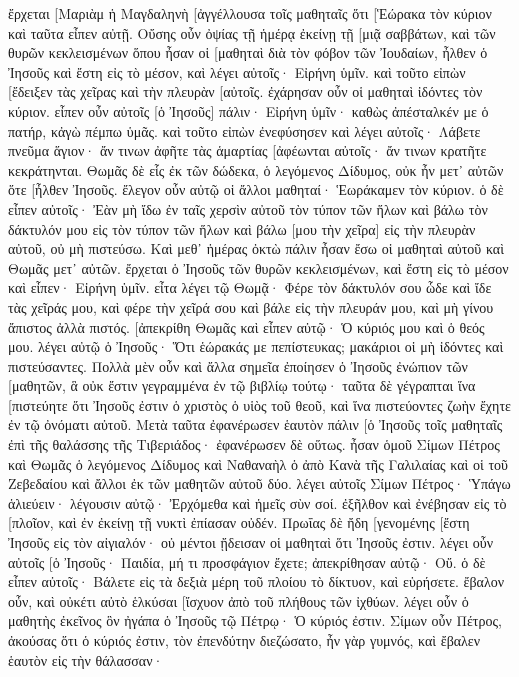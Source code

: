 ἔρχεται [Μαριὰμ ἡ Μαγδαληνὴ [ἀγγέλλουσα τοῖς μαθηταῖς ὅτι [Ἑώρακα τὸν κύριον καὶ ταῦτα εἶπεν αὐτῇ. 
Οὔσης οὖν ὀψίας τῇ ἡμέρᾳ ἐκείνῃ τῇ [μιᾷ σαββάτων, καὶ τῶν θυρῶν κεκλεισμένων ὅπου ἦσαν οἱ [μαθηταὶ διὰ τὸν φόβον τῶν Ἰουδαίων, ἦλθεν ὁ Ἰησοῦς καὶ ἔστη εἰς τὸ μέσον, καὶ λέγει αὐτοῖς· Εἰρήνη ὑμῖν. 
καὶ τοῦτο εἰπὼν [ἔδειξεν τὰς χεῖρας καὶ τὴν πλευρὰν [αὐτοῖς. ἐχάρησαν οὖν οἱ μαθηταὶ ἰδόντες τὸν κύριον. 
εἶπεν οὖν αὐτοῖς [ὁ Ἰησοῦς] πάλιν· Εἰρήνη ὑμῖν· καθὼς ἀπέσταλκέν με ὁ πατήρ, κἀγὼ πέμπω ὑμᾶς. 
καὶ τοῦτο εἰπὼν ἐνεφύσησεν καὶ λέγει αὐτοῖς· Λάβετε πνεῦμα ἅγιον· 
ἄν τινων ἀφῆτε τὰς ἁμαρτίας [ἀφέωνται αὐτοῖς· ἄν τινων κρατῆτε κεκράτηνται. 
Θωμᾶς δὲ εἷς ἐκ τῶν δώδεκα, ὁ λεγόμενος Δίδυμος, οὐκ ἦν μετ᾽ αὐτῶν ὅτε [ἦλθεν Ἰησοῦς. 
ἔλεγον οὖν αὐτῷ οἱ ἄλλοι μαθηταί· Ἑωράκαμεν τὸν κύριον. ὁ δὲ εἶπεν αὐτοῖς· Ἐὰν μὴ ἴδω ἐν ταῖς χερσὶν αὐτοῦ τὸν τύπον τῶν ἥλων καὶ βάλω τὸν δάκτυλόν μου εἰς τὸν τύπον τῶν ἥλων καὶ βάλω [μου τὴν χεῖρα] εἰς τὴν πλευρὰν αὐτοῦ, οὐ μὴ πιστεύσω. 
Καὶ μεθ᾽ ἡμέρας ὀκτὼ πάλιν ἦσαν ἔσω οἱ μαθηταὶ αὐτοῦ καὶ Θωμᾶς μετ᾽ αὐτῶν. ἔρχεται ὁ Ἰησοῦς τῶν θυρῶν κεκλεισμένων, καὶ ἔστη εἰς τὸ μέσον καὶ εἶπεν· Εἰρήνη ὑμῖν. 
εἶτα λέγει τῷ Θωμᾷ· Φέρε τὸν δάκτυλόν σου ὧδε καὶ ἴδε τὰς χεῖράς μου, καὶ φέρε τὴν χεῖρά σου καὶ βάλε εἰς τὴν πλευράν μου, καὶ μὴ γίνου ἄπιστος ἀλλὰ πιστός. 
[ἀπεκρίθη Θωμᾶς καὶ εἶπεν αὐτῷ· Ὁ κύριός μου καὶ ὁ θεός μου. 
λέγει αὐτῷ ὁ Ἰησοῦς· Ὅτι ἑώρακάς με πεπίστευκας; μακάριοι οἱ μὴ ἰδόντες καὶ πιστεύσαντες. 
Πολλὰ μὲν οὖν καὶ ἄλλα σημεῖα ἐποίησεν ὁ Ἰησοῦς ἐνώπιον τῶν [μαθητῶν, ἃ οὐκ ἔστιν γεγραμμένα ἐν τῷ βιβλίῳ τούτῳ· 
ταῦτα δὲ γέγραπται ἵνα [πιστεύητε ὅτι Ἰησοῦς ἐστιν ὁ χριστὸς ὁ υἱὸς τοῦ θεοῦ, καὶ ἵνα πιστεύοντες ζωὴν ἔχητε ἐν τῷ ὀνόματι αὐτοῦ. 
Μετὰ ταῦτα ἐφανέρωσεν ἑαυτὸν πάλιν [ὁ Ἰησοῦς τοῖς μαθηταῖς ἐπὶ τῆς θαλάσσης τῆς Τιβεριάδος· ἐφανέρωσεν δὲ οὕτως. 
ἦσαν ὁμοῦ Σίμων Πέτρος καὶ Θωμᾶς ὁ λεγόμενος Δίδυμος καὶ Ναθαναὴλ ὁ ἀπὸ Κανὰ τῆς Γαλιλαίας καὶ οἱ τοῦ Ζεβεδαίου καὶ ἄλλοι ἐκ τῶν μαθητῶν αὐτοῦ δύο. 
λέγει αὐτοῖς Σίμων Πέτρος· Ὑπάγω ἁλιεύειν· λέγουσιν αὐτῷ· Ἐρχόμεθα καὶ ἡμεῖς σὺν σοί. ἐξῆλθον καὶ ἐνέβησαν εἰς τὸ [πλοῖον, καὶ ἐν ἐκείνῃ τῇ νυκτὶ ἐπίασαν οὐδέν. 
Πρωΐας δὲ ἤδη [γενομένης [ἔστη Ἰησοῦς εἰς τὸν αἰγιαλόν· οὐ μέντοι ᾔδεισαν οἱ μαθηταὶ ὅτι Ἰησοῦς ἐστιν. 
λέγει οὖν αὐτοῖς [ὁ Ἰησοῦς· Παιδία, μή τι προσφάγιον ἔχετε; ἀπεκρίθησαν αὐτῷ· Οὔ. 
ὁ δὲ εἶπεν αὐτοῖς· Βάλετε εἰς τὰ δεξιὰ μέρη τοῦ πλοίου τὸ δίκτυον, καὶ εὑρήσετε. ἔβαλον οὖν, καὶ οὐκέτι αὐτὸ ἑλκύσαι [ἴσχυον ἀπὸ τοῦ πλήθους τῶν ἰχθύων. 
λέγει οὖν ὁ μαθητὴς ἐκεῖνος ὃν ἠγάπα ὁ Ἰησοῦς τῷ Πέτρῳ· Ὁ κύριός ἐστιν. Σίμων οὖν Πέτρος, ἀκούσας ὅτι ὁ κύριός ἐστιν, τὸν ἐπενδύτην διεζώσατο, ἦν γὰρ γυμνός, καὶ ἔβαλεν ἑαυτὸν εἰς τὴν θάλασσαν· 
